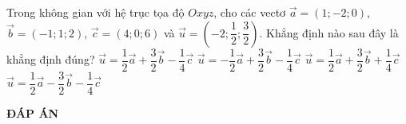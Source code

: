 \begin{ex}%
	Trong không gian với hệ trục tọa độ $Oxyz$, cho các vectơ $\overrightarrow{a}=(1;-2;0)$, $\overrightarrow{b}=(-1;1;2)$, $\overrightarrow{c}=(4;0;6)$ và $\overrightarrow{u}=\left(-2;\dfrac{1}{2};\dfrac{3}{2}\right)$. Khẳng định nào sau đây là khẳng định đúng?
	\choice
	{\True $\overrightarrow{u}=\dfrac{1}{2}\overrightarrow{a}+\dfrac{3}{2}\overrightarrow{b}-\dfrac{1}{4}\overrightarrow{c}$}
	{$\overrightarrow{u}=-\dfrac{1}{2}\overrightarrow{a}+\dfrac{3}{2}\overrightarrow{b}-\dfrac{1}{4}\overrightarrow{c}$}
	{$\overrightarrow{u}=\dfrac{1}{2}\overrightarrow{a}+\dfrac{3}{2}\overrightarrow{b}+\dfrac{1}{4}\overrightarrow{c}$}
	{$\overrightarrow{u}=\dfrac{1}{2}\overrightarrow{a}-\dfrac{3}{2}\overrightarrow{b}-\dfrac{1}{4}\overrightarrow{c}$}
\end{ex}

\newpage
\begin{center}
	\textbf{ĐÁP ÁN}
\end{center}
\begin{multicols}{10}
	 
\end{multicols}